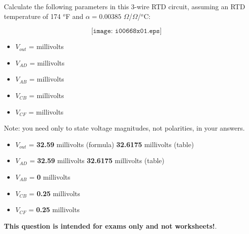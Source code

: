 

Calculate the following parameters in this 3-wire RTD circuit, assuming an RTD temperature of 174 $^{o}$F and $\alpha = 0.00385$ $\Omega$/$\Omega$/$^{o}$C:

$$\texttt{[image: i00668x01.eps]}$$

\begin{itemize}
\item{} $V_{out}$ = \underbar{\hskip 50pt} millivolts
\vskip 10pt
\item{} $V_{AD}$ = \underbar{\hskip 50pt} millivolts 
\vskip 10pt
\item{} $V_{AB}$ = \underbar{\hskip 50pt} millivolts 
\vskip 10pt
\item{} $V_{CB}$ = \underbar{\hskip 50pt} millivolts 
\vskip 10pt
\item{} $V_{CF}$ = \underbar{\hskip 50pt} millivolts 
\end{itemize}

Note: you need only to state voltage magnitudes, not polarities, in your answers.







\begin{itemize}
\item{} $V_{out}$ = {\bf 32.59} millivolts (formula) \hskip 30pt {\bf 32.6175} millivolts (table) 
\vskip 10pt
\item{} $V_{AD}$ = {\bf 32.59} millivolts \hskip 30pt {\bf 32.6175} millivolts (table) 
\vskip 10pt
\item{} $V_{AB}$ = {\bf 0} millivolts 
\vskip 10pt
\item{} $V_{CB}$ = {\bf 0.25} millivolts 
\vskip 10pt
\item{} $V_{CF}$ = {\bf 0.25} millivolts 
\end{itemize}







{\bf This question is intended for exams only and not worksheets!}.


